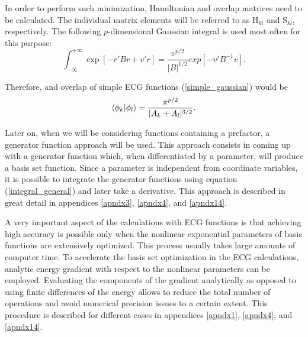 In order to perform such minimization, Hamiltonian and overlap matrices need
to be calculated. The individual matrix elements will be referred to as H$_{kl}$
and S$_{kl}$, respectively. The following $p$-dimensional Gaussian integral is used 
most often for this purpose:
\begin{equation}
\int_{-\infty}^{+\infty} \exp \left[ - r'Br + v'r \right] = 
\frac{\pi^{p/2}}{|B|^{1/2}} exp [-v'B^{-1}v].
\label{integral_general}
\end{equation}

Therefore, and overlap of simple ECG functions (\ref{simple_gaussian}) would be
\begin{equation}
\bra{\phi_k}\ket{\phi_l} = 
\frac{\pi^{p/2}}{|A_{k}+A_{l}|^{3/2}}.
\end{equation}

Later on, when we will be considering functions containing a prefactor, 
a generator function approach will be used. This approach consists in 
coming up with a generator function which, when differentiated by a 
parameter, will produce a basis set function. Since a parameter is 
independent from coordinate variables, it is possible to integrate 
the generator functions using equation (\ref{integral_general}) and 
later take a derivative. This approach is described in great detail in
appendices \ref{apndx3}, \ref{apndx4}, and \ref{apndx14}.

A very important aspect of the calculations with ECG functions is that achieving 
high accuracy is possible only when the nonlinear exponential parameters of basis 
functions are extensively optimized. This process usually takes large amounts of 
computer time. To accelerate the basis set optimization in the ECG calculations, 
analytic energy gradient with respect to the nonlinear parameters can be employed. 
Evaluating the components of the gradient analytically as opposed to using finite 
differences of the energy allows to reduce the total number of operations
and avoid numerical precision issues to a certain extent.
This procedure is described for different cases in appendices \ref{apndx1}, 
\ref{apndx4}, and \ref{apndx14}.


